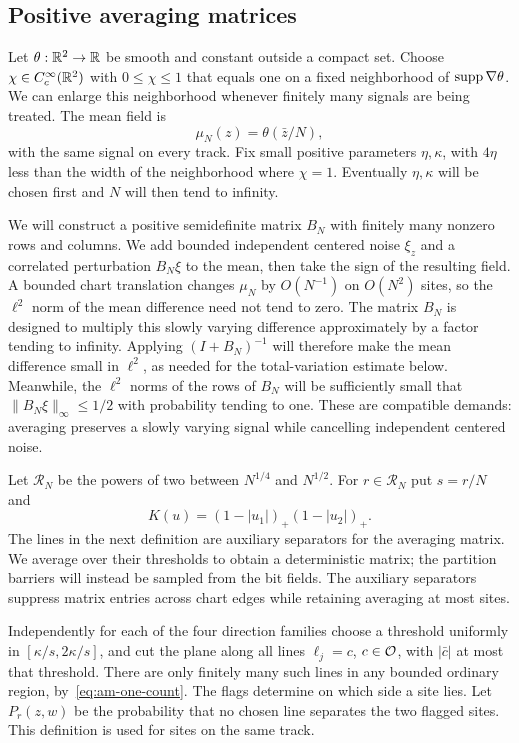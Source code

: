 \subsection{Positive averaging matrices}

Let $\theta:\mathbb R^2\to\mathbb R$ be smooth and constant outside a compact set.
Choose $\chi\in C_c^\infty(\mathbb R^2)$ with $0\le\chi\le1$ that equals one
on a fixed neighborhood of $\operatorname{supp}\nabla\theta$.  We can enlarge this
neighborhood whenever finitely many signals are being treated.  The mean
field is
\[
 \mu_N(z)=\theta(\bar z/N),
\]
with the same signal on every track.  Fix small positive parameters
$\eta,\kappa$, with $4\eta$ less than the width of the neighborhood where
$\chi=1$.  Eventually $\eta,\kappa$ will be chosen first and $N$ will then
tend to infinity.

We will construct a positive semidefinite matrix $B_N$ with finitely many
nonzero rows and columns.  We add bounded independent centered noise $\xi_z$
and a correlated perturbation $B_N\xi$ to the mean, then take the sign of
the resulting field.  A bounded chart translation changes $\mu_N$ by $O(N^{-1})$ on
$O(N^2)$ sites, so the $\ell^2$ norm of the mean difference need not tend
to zero.  The matrix $B_N$ is designed to multiply
this slowly varying difference approximately by a factor tending to
infinity.  Applying $(I+B_N)^{-1}$ will therefore make the mean difference
small in $\ell^2$, as needed for the total-variation estimate below.
Meanwhile, the $\ell^2$ norms of the rows of $B_N$ will be
sufficiently small that $\|B_N\xi\|_\infty\le1/2$ with probability tending
to one.  These are compatible demands: averaging preserves a slowly
varying signal while cancelling independent centered noise.

Let $\mathcal R_N$ be the powers of two between $N^{1/4}$ and $N^{1/2}$.
For $r\in\mathcal R_N$ put $s=r/N$ and
\[
 K(u)=(1-|u_1|)_+(1-|u_2|)_+.
\]
The lines in the next definition are auxiliary separators for the averaging
matrix.  We average over their thresholds to obtain a deterministic matrix;
the partition barriers will instead be sampled from the bit fields.  The
auxiliary separators suppress matrix entries across chart edges while
retaining averaging at most sites.

Independently for each of the four direction families choose a threshold
uniformly in $[\kappa/s,2\kappa/s]$, and cut the plane along all lines
$\ell_j=c$, $c\in\mathcal O$, with $|\bar c|$ at most that threshold.
There are only finitely many such lines in any bounded ordinary region,
by~\eqref{eq:am-one-count}.  The flags determine on which side a site lies.
Let $P_r(z,w)$ be the probability that no chosen line separates the two
flagged sites.  This definition is used for sites on the same track.


